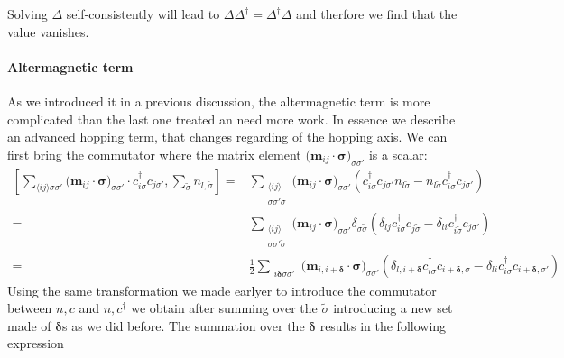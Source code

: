 \documentclass[../main.tex]{subfile}
\begin{document}
Solving $\Delta$ self-consistently will lead to $\Delta\Delta^{\dagger} = \Delta^{\dagger}\Delta$ and therfore we find that the value vanishes.

\paragraph{Altermagnetic term}
As we introduced it in a previous discussion, the altermagnetic term is more complicated than the last one treated an need more work. In essence we describe an 
advanced hopping term, that changes regarding of the hopping axis.
We can first bring the commutator where the matrix element $\bigl(\bm{m}_{ij}\cdot\bm{\sigma}\bigr)_{\sigma\sigma'} $ is a scalar:
\begin{equation*}
    \begin{aligned}
    \left[\sum_{\langle i j \rangle\sigma\sigma'}\bigl(\bm{m}_{ij}\cdot\bm{\sigma}\bigr)_{\sigma\sigma'} 
         \cdot c_{i\sigma}^{\dagger}c_{j\sigma'}, \sum_{\tilde{\sigma}} n_{l,\tilde{\sigma}}\right] 
        =&\sum_{\substack{\langle i j \rangle \\\sigma\sigma'\tilde{\sigma}}} 
         \bigl(\bm{m}_{ij}\cdot\bm{\sigma}\bigr)_{\sigma\sigma'}  \left(c_{i\sigma}^{\dagger}c_{j\sigma'}n_{l\tilde{\sigma}} 
        -n_{l\tilde{\sigma}}c_{i\sigma}^{\dagger}c_{j\sigma'} \right)\\
        = &\sum_{\substack{\langle i j \rangle \\\sigma\sigma'\tilde{\sigma}}}  \bigl(\bm{m}_{ij}\cdot\bm{\sigma}\bigr)_{\sigma\sigma'}  
         \delta_{\sigma\tilde{\sigma}} \left(\delta_{lj}c_{i\sigma}^{\dagger}c_{j\tilde{\sigma}} - \delta_{li}c_{i\tilde{\sigma}}^{\dagger}c_{j\sigma'}\right)\\
        = &\frac{1}{2}\sum_{\substack{ i \bm{\delta}\sigma\sigma'}}  \bigl(\bm{m}_{i,i+\bm{\delta}}\cdot\bm{\sigma}\bigr)_{\sigma\sigma'}  
         \left(\delta_{l,i+\bm{\delta}}c_{i\sigma}^{\dagger}c_{i+\bm{\delta},\sigma} - \delta_{li}c_{i\sigma}^{\dagger}c_{i+\bm{\delta},\sigma'}\right)
    \end{aligned}
\end{equation*}
Using the same transformation we made earlyer to introduce the commutator between $n,c$ and $n,c^{\dagger}$ we obtain after summing over the $\tilde{\sigma}$
introducing a new set made of  $\bm{\delta}$s as we did before. The summation over the $\bm{\delta}$ results in the following  expression
\end{document}
